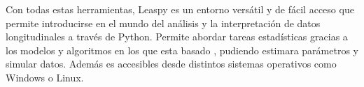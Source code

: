 	Con todas estas herramientas, Leaspy es un entorno versátil y de fácil acceso que permite introducirse en el mundo del análisis y la interpretación de datos longitudinales a través de Python. Permite abordar tareas estadísticas gracias a los modelos y algoritmos en los que esta basado , pudiendo estimara parámetros y simular datos. Además es accesibles desde distintos sistemas operativos como Windows o Linux.